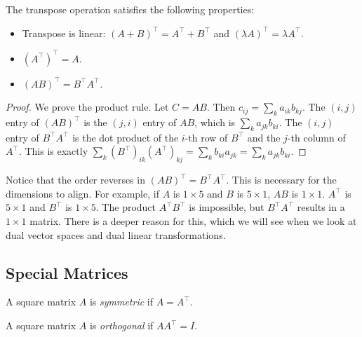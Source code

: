 \documentclass[../linear_algebra_and_groups.tex]{subfiles}
\begin{document}
\begin{proposition}
    \begin{shaded*}
        The transpose operation satisfies the following properties:
        \begin{itemize}
            \item Transpose is linear: $(A+B)^\top = A^\top + B^\top$ and $(\lambda A)^\top = \lambda A^\top$.
            \item $(A^\top)^\top = A$.
            \item $(AB)^\top = B^\top A^\top$.
        \end{itemize}
    \end{shaded*}
\end{proposition}
\begin{proof}
    We prove the product rule. Let $C = AB$. Then $c_{ij} = \sum_k a_{ik}b_{kj}$.
    The $(i,j)$ entry of $(AB)^\top$ is the $(j,i)$ entry of $AB$, which is $\sum_k a_{jk}b_{ki}$.
    The $(i,j)$ entry of $B^\top A^\top$ is the dot product of the $i$-th row of $B^\top$ and the $j$-th column of $A^\top$.
    This is exactly $\sum_k (B^\top)_{ik}(A^\top)_{kj} = \sum_k b_{ki}a_{jk} = \sum_k a_{jk}b_{ki}$.
    \qedhere
\end{proof}

\begin{remark}
    Notice that the order reverses in $(AB)^\top = B^\top A^\top$. This is necessary for the dimensions to align. For example, if $A$ is $1 \times 5$ and $B$ is $5 \times 1$, $AB$ is $1 \times 1$. $A^\top$ is $5 \times 1$ and $B^\top$ is $1 \times 5$. The product $A^\top B^\top$ is impossible, but $B^\top A^\top$ results in a $1 \times 1$ matrix. There is a deeper reason for this, which we will see when we look at dual vector spaces and dual linear transformations.
\end{remark}

\subsection{Special Matrices}

\begin{definition}
    \begin{shaded*}
        A square matrix $A$ is \textit{symmetric} if $A=A^\top$.
    \end{shaded*}
\end{definition}

\begin{definition}
    \begin{shaded*}
        A square matrix $A$ is \textit{orthogonal} if $AA^\top = I$.
    \end{shaded*}
\end{definition}
\end{document}
